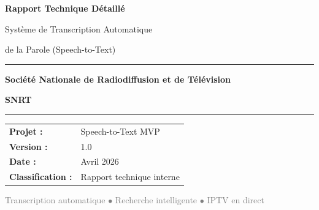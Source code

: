 \documentclass[12pt,a4paper]{report}
\begin{document}
\begin{titlepage}
    \centering
    \vspace*{2cm}

    {\Huge\bfseries\textcolor{snrtblue}{Rapport Technique Détaillé}\par}
    \vspace{0.5cm}
    {\LARGE\textcolor{snrtblue!70}{Système de Transcription Automatique}\par}
    {\LARGE\textcolor{snrtblue!70}{de la Parole (Speech-to-Text)}\par}

    \vspace{1.5cm}

    \rule{\textwidth}{1.5pt}
    \vspace{0.5cm}
    {\Large\textbf{Société Nationale de Radiodiffusion et de Télévision}\par}
    {\Large\textbf{SNRT}\par}
    \vspace{0.5cm}
    \rule{\textwidth}{1.5pt}

    \vspace{2cm}

    {\large
    \begin{tabular}{ll}
        \textbf{Projet :} & Speech-to-Text MVP \\
        \textbf{Version :} & 1.0 \\
        \textbf{Date :} & Avril 2026 \\
        \textbf{Classification :} & Rapport technique interne \\
    \end{tabular}
    }

    \vfill

    {\large\textcolor{gray}{Transcription automatique $\bullet$ Recherche intelligente $\bullet$ IPTV en direct}}

\end{titlepage}

\tableofcontents
\newpage

\listoffigures
\listoftables
\newpage
\end{document}
